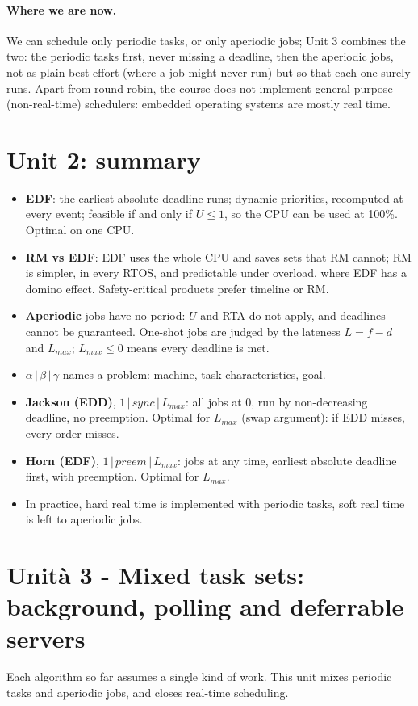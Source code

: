 \paragraph{Where we are now.} We can schedule only periodic tasks, or only aperiodic jobs; Unit 3 combines the two: the periodic tasks first, never missing a deadline, then the aperiodic jobs, not as plain best effort (where a job might never run) but so that each one surely runs. Apart from round robin, the course does not implement general-purpose (non-real-time) schedulers: embedded operating systems are mostly real time.

\section{Unit 2: summary}
\begin{itemize}
    \item \textbf{EDF}: the earliest absolute deadline runs; dynamic priorities, recomputed at every event; feasible if and only if $U \le 1$, so the CPU can be used at 100\%. Optimal on one CPU.
    \item \textbf{RM vs EDF}: EDF uses the whole CPU and saves sets that RM cannot; RM is simpler, in every RTOS, and predictable under overload, where EDF has a domino effect. Safety-critical products prefer timeline or RM.
    \item \textbf{Aperiodic} jobs have no period: $U$ and RTA do not apply, and deadlines cannot be guaranteed. One-shot jobs are judged by the lateness $L = f - d$ and $L_{max}$; $L_{max} \le 0$ means every deadline is met.
    \item $\alpha \,|\, \beta \,|\, \gamma$ names a problem: machine, task characteristics, goal.
    \item \textbf{Jackson (EDD)}, $1 \,|\, \textit{sync} \,|\, L_{max}$: all jobs at 0, run by non-decreasing deadline, no preemption. Optimal for $L_{max}$ (swap argument): if EDD misses, every order misses.
    \item \textbf{Horn (EDF)}, $1 \,|\, \textit{preem} \,|\, L_{max}$: jobs at any time, earliest absolute deadline first, with preemption. Optimal for $L_{max}$.
    \item In practice, hard real time is implemented with periodic tasks, soft real time is left to aperiodic jobs.
\end{itemize}

\section{Unità 3 - Mixed task sets: background, polling and deferrable servers}
Each algorithm so far assumes a single kind of work. This unit mixes periodic tasks and aperiodic jobs, and closes real-time scheduling.

